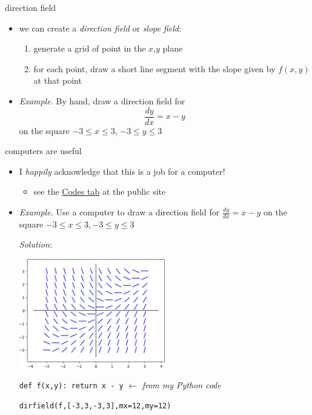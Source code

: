 \documentclass[colorlinks]{beamer}
\begin{document}
\begin{frame}{direction field}

\begin{itemize}
\item we can create a \emph{direction field} or \emph{slope field}:
    \begin{enumerate}
    \item generate a grid of point in the $x$,$y$ plane
    \item for each point, draw a short line segment with the slope given by $f(x,y)$ at that point
    \end{enumerate}

\bigskip
\item \begin{minipage}[t]{0.39\textwidth}
\emph{Example.}  By hand, draw a direction field for
$$\frac{dy}{dx} = x-y$$
on the square $-3 \le x \le 3$, $-3 \le y \le 3$
\end{minipage} 

\vspace{20mm}
\end{itemize}
\end{frame}


\begin{frame}{computers are useful}

\begin{itemize}
\item I \emph{happily} acknowledge that this is a job for a computer!
    \begin{itemize}
    \item see the \href{https://bueler.github.io/math302/codes.html}{Codes tab} at the public site
    \end{itemize}

\medskip
\item \emph{Example.}  Use a computer to draw a direction field for
$\frac{dy}{dx} = x-y$ on the square $-3 \le x \le 3, -3 \le y \le 3$

\bigskip
\emph{Solution}:

\vspace{-3mm}
\hfill \includegraphics[width=0.5\textwidth]{figs/example-field} \phantom{as dfjadl dsf}

\medskip
\scriptsize
\texttt{def f(x,y):  return x - y}  \hfill $\longleftarrow$ \emph{from my Python code}

\texttt{dirfield(f,[-3,3,-3,3],mx=12,my=12)}
\end{itemize}
\end{frame}
\end{document}
